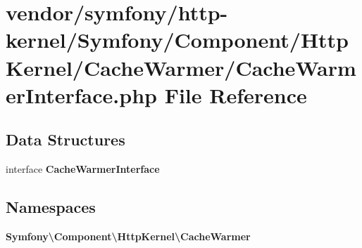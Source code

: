 \section{vendor/symfony/http-\/kernel/\+Symfony/\+Component/\+Http\+Kernel/\+Cache\+Warmer/\+Cache\+Warmer\+Interface.php File Reference}
\label{_cache_warmer_interface_8php}
\subsection*{Data Structures}
\begin{DoxyCompactItemize}
\item 
interface {\bf Cache\+Warmer\+Interface}
\end{DoxyCompactItemize}
\subsection*{Namespaces}
\begin{DoxyCompactItemize}
\item 
 {\bf Symfony\textbackslash{}\+Component\textbackslash{}\+Http\+Kernel\textbackslash{}\+Cache\+Warmer}
\end{DoxyCompactItemize}
